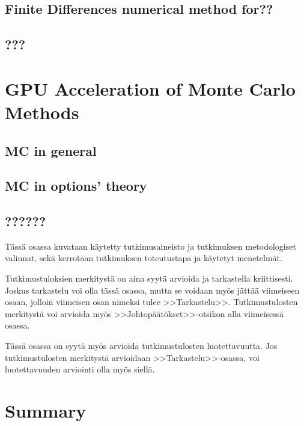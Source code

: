 \documentclass[english,12pt,a4paper,pdftex,sci,utf8]{aaltothesis}
\begin{document}
\subsection{Finite Differences numerical method for??}
\subsection{???}

\section{GPU Acceleration of Monte Carlo Methods} \label{sec:gpu-mc}
\subsection{MC in general}
\subsection{MC in options' theory}
\subsection{??????}

T\"ass\"a osassa kuvataan k\"aytetty tutkimusaineisto ja
tutkimuksen metodologiset valinnat, sek\"a
kerrotaan tutkimuksen toteutustapa ja k\"aytetyt menetelm\"at. 

\clearpage


Tutkimustuloksien merkityst\"a on aina syyt\"a arvioida ja tarkastella
kriittisesti.  Joskus tarkastelu voi olla t\"ass\"a osassa, mutta se
voidaan my\"os j\"att\"a\"a viimeiseen osaan, jolloin viimeisen osan nimeksi
tulee >>Tarkastelu>>. Tutkimustulosten merkityst\"a voi arvioida my\"os
>>Johtop\"a\"at\"okset>>-otsikon alla viimeisess\"a osassa. 

T\"ass\"a osassa on syyt\"a my\"os arvioida tutkimustulosten luotettavuutta.
Jos tutkimustulosten merkityst\"a arvioidaan >>Tarkastelu>>-osassa,
voi luotettavuuden arviointi olla my\"os siell\"a. 

\clearpage

\section{Summary}  \label{sec:summary}
\end{document}
